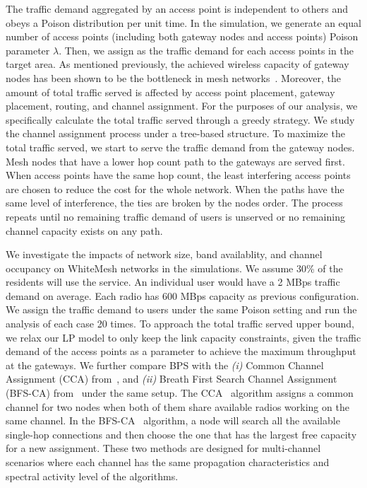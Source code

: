 The traffic demand aggregated by an access point is independent to others and obeys a Poison distribution
per unit time. 
In the simulation, we generate an equal number of access points (including both gateway nodes and 
access points) Poison parameter $\lambda$. 
Then, we assign as the traffic demand for each access points in the 
target area.
As mentioned previously, the achieved wireless capacity of gateway nodes has been shown to be the 
bottleneck in mesh networks~\cite{robinson2010deploying}. Moreover, the amount of total traffic served is affected 
by access point placement, gateway placement, routing, and channel assignment. For the purposes 
of our analysis, we specifically calculate the total traffic served through a greedy strategy. 
We study the channel assignment process under a tree-based structure. 
To maximize the total traffic served, we start to serve the traffic demand from the gateway nodes. 
Mesh nodes that have a lower hop count path to the gateways are served first. 
When access points have the same hop count, the least interfering access points are chosen to 
reduce the cost for the whole network. When the paths have the same level of interference, the ties 
are broken by the nodes order.
The process repeats until no remaining traffic demand of users 
is unserved or no remaining channel capacity exists on any path.

We investigate the impacts of network size, band availablity, and channel occupancy on WhiteMesh networks 
in the simulations.
We assume 30\% of the residents will use the service. An individual user would have a 2 MBps 
traffic demand on average. Each radio has 600 MBps capacity as previous configuration.
We assign the traffic demand to users under the same Poison setting and 
run the analysis of each case 20 times. To approach the total traffic served upper bound, we relax our LP 
model to only keep the link capacity constraints, given the traffic demand of the access points as a 
parameter to achieve the maximum throughput at the gateways. We further compare BPS with the 
{\it (i)} Common Channel Assignment (CCA) from~\cite{draves2004routing},
and {\it (ii)} Breath First Search Channel Assignment (BFS-CA) from~\cite{tang2005interference}
under the same setup.
The CCA~\cite{draves2004routing} algorithm assigns a common channel for two nodes when both of them 
share available radios working on the same channel. In the BFS-CA~\cite{tang2005interference} algorithm, 
a node will search all the available single-hop connections and then choose the one that has the largest 
free capacity for a new assignment. 
These two methods are designed for multi-channel scenarios 
where each channel has the same propagation characteristics and spectral activity 
level of the algorithms.



